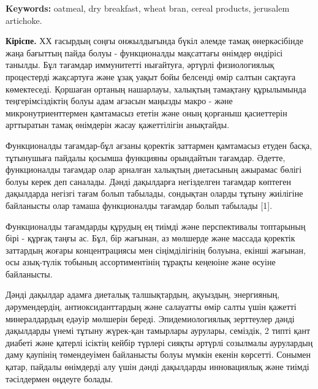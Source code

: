 {\bfseries Keywords:} oatmeal, dry breakfast, wheat bran, cereal products,
jerusalem artichoke.

{\bfseries Кіріспе.} ХХ ғасырдың соңғы онжылдығында бүкіл әлемде тамақ
өнеркәсібінде жаңа бағыттың пайда болуы - функционалды мақсаттағы
өнімдер өндірісі танылды. Бұл тағамдар иммунитетті нығайтуға, әртүрлі
физиологиялық процестерді жақсартуға және ұзақ уақыт бойы белсенді өмір
салтын сақтауға көмектеседі. Қоршаған ортаның нашарлауы, халықтың
тамақтану құрылымында теңгерімсіздіктің болуы адам ағзасын маңызды макро
- және микронутриенттермен қамтамасыз ететін және оның қорғаныш
қасиеттерін арттыратын тамақ өнімдерін жасау қажеттілігін анықтайды.

Функционалды тағамдар-бұл ағзаны қоректік заттармен қамтамасыз етуден
басқа, тұтынушыға пайдалы қосымша функцияны орындайтын тағамдар. Әдетте,
функционалды тағамдар олар арналған халықтың диетасының ажырамас бөлігі
болуы керек деп саналады. Дәнді дақылдарға негізделген тағамдар көптеген
дақылдарда негізгі тағам болып табылады, сондықтан оларды тұтыну
жиілігіне байланысты олар тамаша функционалды тағамдар болып табылады
{[}1{]}.

Функционалды тағамдарды құрудың ең тиімді және перспективалы топтарының
бірі - құрғақ таңғы ас. Бұл, бір жағынан, аз мөлшерде және массада
қоректік заттардың жоғары концентрациясы мен сіңімділігінің болуына,
екінші жағынан, осы азық-түлік тобының ассортиментінің тұрақты кеңеюіне
және өсуіне байланысты.

Дәнді дақылдар адамға диеталық талшықтардың, ақуыздың, энергияның,
дәрумендердің, антиоксиданттардың және салауатты өмір салты үшін қажетті
минералдардың едәуір мөлшерін береді. Эпидемиологиялық зерттеулер дәнді
дақылдарды үнемі тұтыну жүрек-қан тамырлары аурулары, семіздік, 2 типті
қант диабеті және қатерлі ісіктің кейбір түрлері сияқты әртүрлі
созылмалы аурулардың даму қаупінің төмендеуімен байланысты болуы мүмкін
екенін көрсетті. Сонымен қатар, пайдалы өнімдерді алу үшін дәнді
дақылдарды инновациялық және тиімді тәсілдермен өңдеуге болады.

